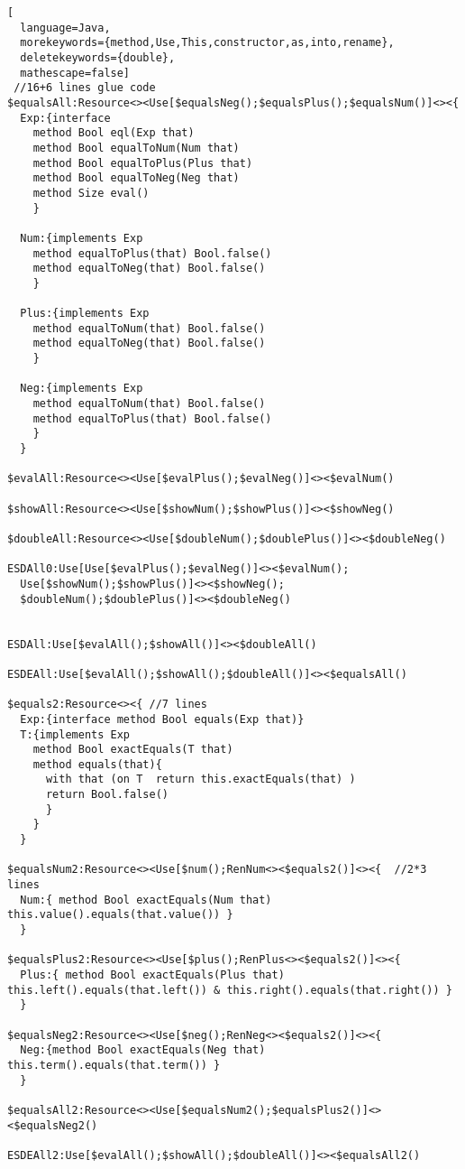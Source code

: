 \begin{lstlisting}[
  language=Java,
  morekeywords={method,Use,This,constructor,as,into,rename},
  deletekeywords={double},
  mathescape=false]
 //16+6 lines glue code
$equalsAll:Resource<><Use[$equalsNeg();$equalsPlus();$equalsNum()]<><{
  Exp:{interface
    method Bool eql(Exp that)
    method Bool equalToNum(Num that)
    method Bool equalToPlus(Plus that)
    method Bool equalToNeg(Neg that)
    method Size eval()
    }

  Num:{implements Exp
    method equalToPlus(that) Bool.false()
    method equalToNeg(that) Bool.false()
    }

  Plus:{implements Exp
    method equalToNum(that) Bool.false()
    method equalToNeg(that) Bool.false()
    }

  Neg:{implements Exp
    method equalToNum(that) Bool.false()
    method equalToPlus(that) Bool.false()
    }
  }

$evalAll:Resource<><Use[$evalPlus();$evalNeg()]<><$evalNum()

$showAll:Resource<><Use[$showNum();$showPlus()]<><$showNeg()

$doubleAll:Resource<><Use[$doubleNum();$doublePlus()]<><$doubleNeg()

ESDAll0:Use[Use[$evalPlus();$evalNeg()]<><$evalNum();
  Use[$showNum();$showPlus()]<><$showNeg();
  $doubleNum();$doublePlus()]<><$doubleNeg()


ESDAll:Use[$evalAll();$showAll()]<><$doubleAll()

ESDEAll:Use[$evalAll();$showAll();$doubleAll()]<><$equalsAll()

$equals2:Resource<><{ //7 lines
  Exp:{interface method Bool equals(Exp that)}
  T:{implements Exp
    method Bool exactEquals(T that)
    method equals(that){
      with that (on T  return this.exactEquals(that) )
      return Bool.false()
      }
    }
  }

$equalsNum2:Resource<><Use[$num();RenNum<><$equals2()]<><{  //2*3 lines
  Num:{ method Bool exactEquals(Num that) this.value().equals(that.value()) }
  }

$equalsPlus2:Resource<><Use[$plus();RenPlus<><$equals2()]<><{
  Plus:{ method Bool exactEquals(Plus that) this.left().equals(that.left()) & this.right().equals(that.right()) }
  }

$equalsNeg2:Resource<><Use[$neg();RenNeg<><$equals2()]<><{
  Neg:{method Bool exactEquals(Neg that) this.term().equals(that.term()) }
  }

$equalsAll2:Resource<><Use[$equalsNum2();$equalsPlus2()]<><$equalsNeg2()

ESDEAll2:Use[$evalAll();$showAll();$doubleAll()]<><$equalsAll2()

\end{lstlisting}

